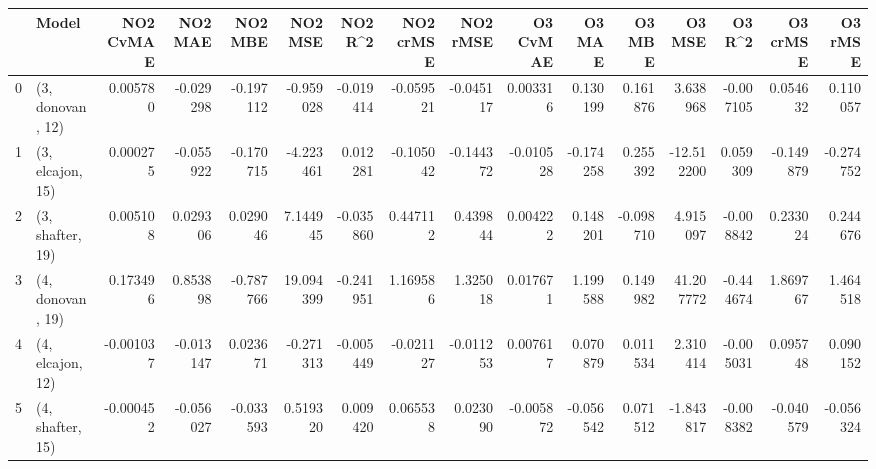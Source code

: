\begin{tabular}{llrrrrrrrrrrrrrr}
\toprule
{} &             Model &  NO2 CvMAE &   NO2 MAE &   NO2 MBE &    NO2 MSE &   NO2 R\textasciicircum2 &  NO2 crMSE &  NO2 rMSE &  O3 CvMAE &    O3 MAE &    O3 MBE &     O3 MSE &    O3 R\textasciicircum2 &  O3 crMSE &   O3 rMSE \\
\midrule
0 &  (3, donovan, 12) &   0.005780 & -0.029298 & -0.197112 &  -0.959028 & -0.019414 &  -0.059521 & -0.045117 &  0.003316 &  0.130199 &  0.161876 &   3.638968 & -0.007105 &  0.054632 &  0.110057 \\
1 &  (3, elcajon, 15) &   0.000275 & -0.055922 & -0.170715 &  -4.223461 &  0.012281 &  -0.105042 & -0.144372 & -0.010528 & -0.174258 &  0.255392 & -12.512200 &  0.059309 & -0.149879 & -0.274752 \\
2 &  (3, shafter, 19) &   0.005108 &  0.029306 &  0.029046 &   7.144945 & -0.035860 &   0.447112 &  0.439844 &  0.004222 &  0.148201 & -0.098710 &   4.915097 & -0.008842 &  0.233024 &  0.244676 \\
3 &  (4, donovan, 19) &   0.173496 &  0.853898 & -0.787766 &  19.094399 & -0.241951 &   1.169586 &  1.325018 &  0.017671 &  1.199588 &  0.149982 &  41.207772 & -0.444674 &  1.869767 &  1.464518 \\
4 &  (4, elcajon, 12) &  -0.001037 & -0.013147 &  0.023671 &  -0.271313 & -0.005449 &  -0.021127 & -0.011253 &  0.007617 &  0.070879 &  0.011534 &   2.310414 & -0.005031 &  0.095748 &  0.090152 \\
5 &  (4, shafter, 15) &  -0.000452 & -0.056027 & -0.033593 &   0.519320 &  0.009420 &   0.065538 &  0.023090 & -0.005872 & -0.056542 &  0.071512 &  -1.843817 & -0.008382 & -0.040579 & -0.056324 \\
\bottomrule
\end{tabular}
